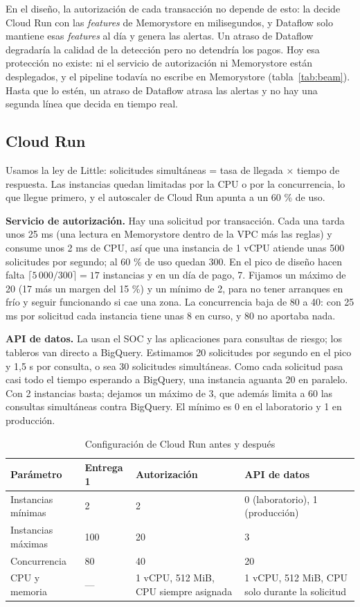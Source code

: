 \documentclass[11pt,a4paper]{article}
\begin{document}
En el diseño, la autorización de cada transacción no depende de esto: la decide Cloud Run con las \textit{features} de Memorystore en milisegundos, y Dataflow solo mantiene esas \textit{features} al día y genera las alertas. Un atraso de Dataflow degradaría la calidad de la detección pero no detendría los pagos. Hoy esa protección no existe: ni el servicio de autorización ni Memorystore están desplegados, y el pipeline todavía no escribe en Memorystore (tabla~\ref{tab:beam}). Hasta que lo estén, un atraso de Dataflow atrasa las alertas y no hay una segunda línea que decida en tiempo real.


\subsection{Cloud Run}\label{sec:cloudrun}

Usamos la ley de Little: solicitudes simultáneas = tasa de llegada × tiempo de respuesta. Las instancias quedan limitadas por la CPU o por la concurrencia, lo que llegue primero, y el autoscaler de Cloud Run apunta a un 60 \% de uso.

\textbf{Servicio de autorización.} Hay una solicitud por transacción. Cada una tarda unos 25 ms (una lectura en Memorystore dentro de la VPC más las reglas) y consume unos 2 ms de CPU, así que una instancia de 1 vCPU atiende unas 500 solicitudes por segundo; al 60 \% de uso quedan 300. En el pico de diseño hacen falta $\lceil 5\,000/300 \rceil = 17$ instancias y en un día de pago, 7. Fijamos un máximo de 20 (17 más un margen del 15 \%) y un mínimo de 2, para no tener arranques en frío y seguir funcionando si cae una zona. La concurrencia baja de 80 a 40: con 25 ms por solicitud cada instancia tiene unas 8 en curso, y 80 no aportaba nada.

\textbf{API de datos.} La usan el SOC y las aplicaciones para consultas de riesgo; los tableros van directo a BigQuery. Estimamos 20 solicitudes por segundo en el pico y 1,5 s por consulta, o sea 30 solicitudes simultáneas. Como cada solicitud pasa casi todo el tiempo esperando a BigQuery, una instancia aguanta 20 en paralelo. Con 2 instancias basta; dejamos un máximo de 3, que además limita a 60 las consultas simultáneas contra BigQuery. El mínimo es 0 en el laboratorio y 1 en producción.

\begin{table}[H]
\centering\small
\caption{Configuración de Cloud Run antes y después}
\label{tab:cloudrun}
\begin{tabularx}{\linewidth}{lLLL}
\toprule
\textbf{Parámetro} & \textbf{Entrega 1} & \textbf{Autorización} & \textbf{API de datos}\\
\midrule
Instancias mínimas & 2 & 2 & 0 (laboratorio), 1 (producción)\\
 Instancias máximas & 100 & 20 & 3\\
Concurrencia & 80 & 40 & 20\\
 CPU y memoria & — & 1 vCPU, 512 MiB, CPU siempre asignada & 1 vCPU, 512 MiB, CPU solo durante la solicitud\\
\bottomrule
\end{tabularx}
\end{table}
\end{document}

